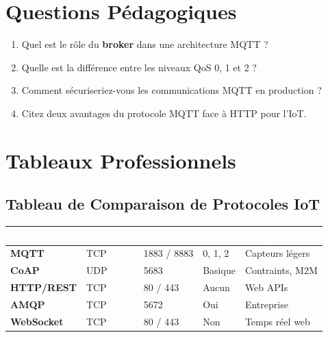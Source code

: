 \documentclass[12pt,a4paper]{report}
\begin{document}
\section{Questions Pédagogiques}

\begin{questionbox}
    \begin{enumerate}
        \item Quel est le rôle du \textbf{broker} dans une architecture MQTT ?
        \item Quelle est la différence entre les niveaux QoS 0, 1 et 2 ?
        \item Comment sécuriseriez-vous les communications MQTT en production ?
        \item Citez deux avantages du protocole MQTT face à HTTP pour l'IoT.
    \end{enumerate}
\end{questionbox}

\section{Tableaux Professionnels}

\subsection{Tableau de Comparaison de Protocoles IoT}

\vspace{0.5em}
\noindent
\begin{tabularx}{\textwidth}{>{\bfseries\sffamily\small}p{2.8cm}
                              >{\centering\arraybackslash\small}X
                              >{\centering\arraybackslash\small}X
                              >{\centering\arraybackslash\small}X
                              >{\centering\arraybackslash\small}X}
    \toprule
    \rowcolor{PrimaryBlue}
    \textcolor{white}{\sffamily Protocole} &
    \textcolor{white}{\sffamily Transport} &
    \textcolor{white}{\sffamily Port} &
    \textcolor{white}{\sffamily QoS} &
    \textcolor{white}{\sffamily Usage typique} \\
    \midrule
    \rowcolor{LightGray}
    MQTT      & TCP       & 1883 / 8883 & 0, 1, 2 & Capteurs légers \\
    CoAP      & UDP       & 5683        & Basique & Contraints, M2M \\
    \rowcolor{LightGray}
    HTTP/REST & TCP       & 80 / 443    & Aucun   & Web APIs \\
    AMQP      & TCP       & 5672        & Oui     & Entreprise \\
    \rowcolor{LightGray}
    WebSocket & TCP       & 80 / 443    & Non     & Temps réel web \\
    \bottomrule
\end{tabularx}
\end{document}
